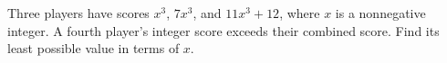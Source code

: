 Three players have scores $x^3$, $7x^3$, and $11x^3+12$, where $x$ is a nonnegative integer. A fourth player's integer score exceeds their combined score. Find its least possible value in terms of $x$.
